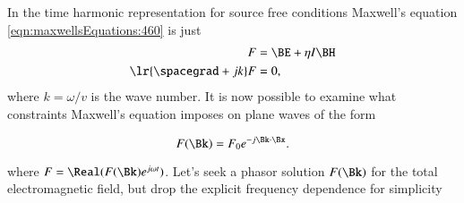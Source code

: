 %
%
In the time harmonic representation for source free conditions Maxwell's equation \cref{eqn:maxwellsEquations:460} is just
\begin{dmath}\label{eqn:planewaves:560}
\begin{aligned}
F &= \BE + \eta I \BH \\
\lr{ \spacegrad + j k } F &= 0,
\end{aligned}
\end{dmath}
where \( k = \omega/v \) is the wave number.
It is now possible to examine what constraints Maxwell's equation imposes on plane waves of the form

\begin{dmath}\label{eqn:planewaves:600}
F(\Bk) = F_0 e^{-j \Bk \cdot \Bx}.
\end{dmath}

where \( F = \Real( F(\Bk) e^{j \omega t} ) \).
Let's seek a phasor solution \( F(\Bk) \) for the total electromagnetic field, but drop the explicit frequency dependence for simplicity



